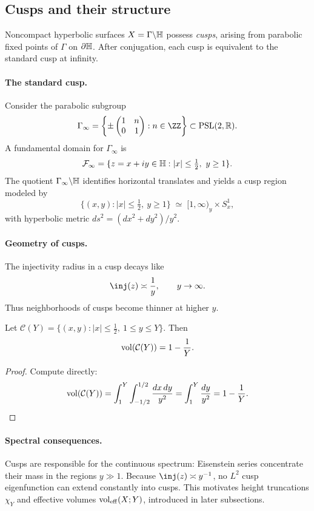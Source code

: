 \subsection{Cusps and their structure}\label{subsec:cusps}

Noncompact hyperbolic surfaces $X=\Gamma\backslash\mathbb{H}$ possess \emph{cusps}, arising from parabolic fixed points of $\Gamma$ on $\partial\mathbb{H}$. After conjugation, each cusp is equivalent to the standard cusp at infinity.

\paragraph{The standard cusp.}
Consider the parabolic subgroup
\[
\Gamma_\infty = \left\{ \pm \begin{pmatrix} 1 & n \\ 0 & 1 \end{pmatrix} : n \in \ZZ \right\} \subset \PSL(2,\RR).
\]
A fundamental domain for $\Gamma_\infty$ is
\[
\mathcal{F}_\infty = \{ z = x+iy \in \mathbb{H} : |x|\le \tfrac12, \ y \ge 1 \}.
\]
The quotient $\Gamma_\infty\backslash \mathbb{H}$ identifies horizontal translates and yields a cusp region modeled by
\[
\{ (x,y) : |x| \le \tfrac12, \ y \ge 1 \} \;\simeq\; [1,\infty)_y \times S^1_x,
\]
with hyperbolic metric $ds^2=(dx^2+dy^2)/y^2$.

\paragraph{Geometry of cusps.}
The injectivity radius in a cusp decays like
\[
\inj(z) \asymp \frac{1}{y}, \qquad y\to\infty.
\]
Thus neighborhoods of cusps become thinner at higher $y$.

\begin{lemma}\label{lem:cusp-vol}
Let $\mathcal{C}(Y) = \{ (x,y): |x|\le \tfrac12, \ 1\le y \le Y\}$. Then
\[
\operatorname{vol}(\mathcal{C}(Y)) = 1 - \frac{1}{Y}.
\]
\end{lemma}

\begin{proof}
Compute directly:
\[
\operatorname{vol}(\mathcal{C}(Y)) = \int_1^Y \int_{-1/2}^{1/2} \frac{dx\,dy}{y^2} 
= \int_1^Y \frac{dy}{y^2}
= 1 - \frac{1}{Y}.
\]
\end{proof}

\paragraph{Spectral consequences.}
Cusps are responsible for the continuous spectrum: Eisenstein series concentrate their mass in the regions $y\gg 1$. Because $\inj(z)\asymp y^{-1}$, no $L^2$ cusp eigenfunction can extend constantly into cusps. This motivates height truncations $\chi_Y$ and effective volumes $\operatorname{vol}_{\mathrm{eff}}(X;Y)$, introduced in later subsections.

